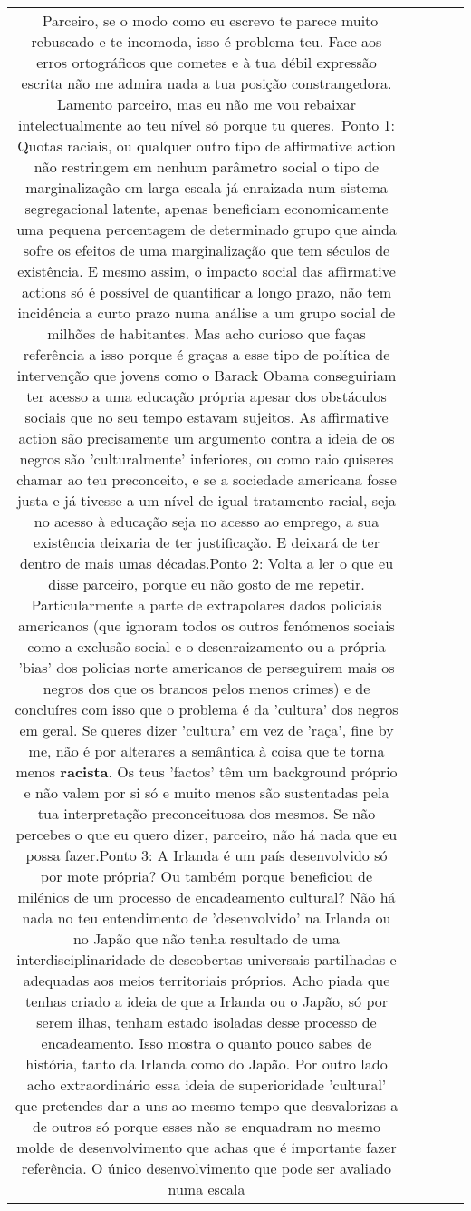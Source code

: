 \documentclass[11pt]{article}
\newlength\mylength
\begin{document}
\begin{center}
\begin{longtable}{|C{.65\mylength}|C{.30\mylength}|C{.12\mylength}|C{.12\mylength}|C{.12\mylength}|}
  \small {} Parceiro, se o modo como eu escrevo te parece muito rebuscado e te incomoda, isso é problema teu. Face aos erros ortográficos que cometes e à tua débil expressão escrita não me admira nada a tua posição constrangedora. Lamento parceiro, mas eu não me vou rebaixar intelectualmente ao teu nível só porque tu queres. Ponto 1: Quotas raciais, ou qualquer outro tipo de affirmative action não restringem em nenhum parâmetro social o tipo de marginalização em larga escala já enraizada num sistema segregacional latente, apenas beneficiam economicamente uma pequena percentagem de determinado grupo que ainda sofre os efeitos de uma marginalização que tem séculos de existência. E mesmo assim, o impacto social das affirmative actions só é possível de quantificar a longo prazo, não tem incidência a curto prazo numa análise a um grupo social de milhões de habitantes. Mas acho curioso que faças referência a isso porque é graças a esse tipo de política de intervenção que jovens como o Barack Obama conseguiriam ter acesso a uma educação própria apesar dos obstáculos sociais que no seu tempo estavam sujeitos. As affirmative action são precisamente um argumento contra a ideia de os negros são 'culturalmente' inferiores, ou como raio quiseres chamar ao teu preconceito, e se a sociedade americana fosse justa e já tivesse a um nível de igual tratamento racial, seja no acesso à educação seja no acesso ao emprego, a sua existência deixaria de ter justificação. E deixará de ter dentro de mais umas décadas.Ponto 2: Volta a ler o que eu disse parceiro, porque eu não gosto de me repetir. Particularmente a parte de extrapolares dados policiais americanos (que ignoram todos os outros fenómenos sociais como a exclusão social e o desenraizamento ou a própria 'bias' dos policias norte americanos de perseguirem mais os negros dos que os brancos pelos menos crimes) e de concluíres com isso que o problema é da 'cultura' dos negros em geral. Se queres dizer 'cultura' em vez de 'raça', fine by me, não é por alterares a semântica à coisa que te torna menos \textbf{racista}. Os teus 'factos' têm um background próprio e não valem por si só e muito menos são sustentadas pela tua interpretação preconceituosa dos mesmos. Se não percebes o que eu quero dizer, parceiro, não há nada que eu possa fazer.Ponto 3: A Irlanda é um país desenvolvido só por mote própria? Ou também porque beneficiou de milénios de um processo de encadeamento cultural? Não há nada no teu entendimento de 'desenvolvido' na Irlanda ou no Japão que não tenha resultado de uma interdisciplinaridade de descobertas universais partilhadas e adequadas aos meios territoriais próprios. Acho piada que tenhas criado a ideia de que a Irlanda ou o Japão, só por serem ilhas, tenham estado isoladas desse processo de encadeamento. Isso mostra o quanto pouco sabes de história, tanto da Irlanda como do Japão. Por outro lado acho extraordinário essa ideia de superioridade 'cultural' que pretendes dar a uns ao mesmo tempo que desvalorizas a de outros só porque esses não se enquadram no mesmo molde de desenvolvimento que achas que é importante fazer referência. O único desenvolvimento que pode ser avaliado numa escala 
\end{longtable}
\end{center}
\end{document}
